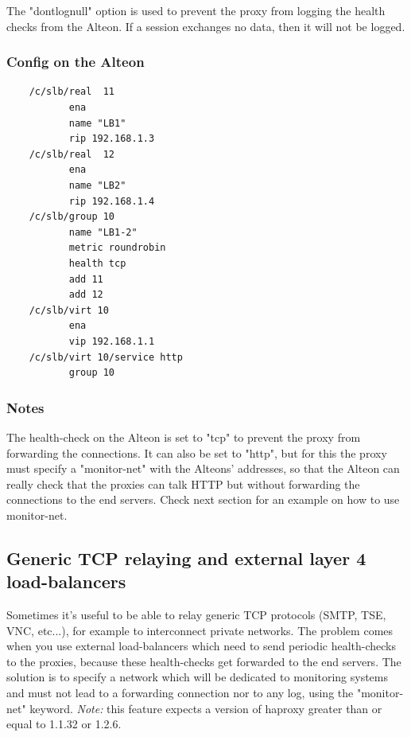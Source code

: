 The "dontlognull" option is used to prevent the proxy from logging the health
checks from the Alteon. If a session exchanges no data, then it will not be
logged.
 
\subsubsection{Config on the Alteon}

\begin{verbatim}
    /c/slb/real  11
           ena
           name "LB1"
           rip 192.168.1.3
    /c/slb/real  12
           ena
           name "LB2"
           rip 192.168.1.4
    /c/slb/group 10
           name "LB1-2"
           metric roundrobin
           health tcp
           add 11
           add 12
    /c/slb/virt 10
           ena
           vip 192.168.1.1
    /c/slb/virt 10/service http
           group 10
\end{verbatim}

\subsubsection{Notes}

The health-check on the Alteon is set to "tcp" to prevent the proxy from
forwarding the connections. It can also be set to "http", but for this the
proxy must specify a "monitor-net" with the Alteons' addresses, so that the
Alteon can really check that the proxies can talk HTTP but without forwarding
the connections to the end servers. Check next section for an example on how to
use monitor-net.

\subsection{Generic TCP relaying and external layer 4 load-balancers}

Sometimes it's useful to be able to relay generic TCP protocols (SMTP, TSE,
VNC, etc...), for example to interconnect private networks. The problem comes
when you use external load-balancers which need to send periodic health-checks
to the proxies, because these health-checks get forwarded to the end servers.
The solution is to specify a network which will be dedicated to monitoring
systems and must not lead to a forwarding connection nor to any log, using the
"monitor-net" keyword. \emph{Note:} this feature expects a version of haproxy greater
than or equal to 1.1.32 or 1.2.6.

